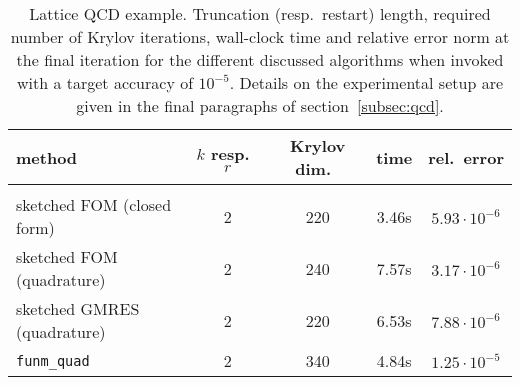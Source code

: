 \begin{table}
\centering
\caption{Lattice QCD example. Truncation (resp.\ restart) length, required number of Krylov iterations, wall-clock time and relative error norm at the final iteration for the different discussed algorithms when invoked with a target accuracy of $10^{-5}$. Details on the experimental setup are given in the final paragraphs of section~\ref{subsec:qcd}.}
\label{tab:qcd}
\begin{tabular}{l|cccc}
method & $k$ resp.\ $r$ & Krylov dim.\ & time & rel.\ error \\[1mm]
\hline\hline\\[-2mm]
sketched FOM (closed form) & 2 & 220 & 3.46s & $5.93 \cdot 10^{-6}$ \\
sketched FOM (quadrature) & 2 & 240 & 7.57s & $3.17 \cdot 10^{-6}$ \\
sketched GMRES (quadrature) & 2 & 220 & 6.53s & $7.88 \cdot 10^{-6}$ \\
\texttt{funm\_quad} &  2 & 340 & 4.84s & $1.25 \cdot 10^{-5}$ \\
\end{tabular}
\end{table}